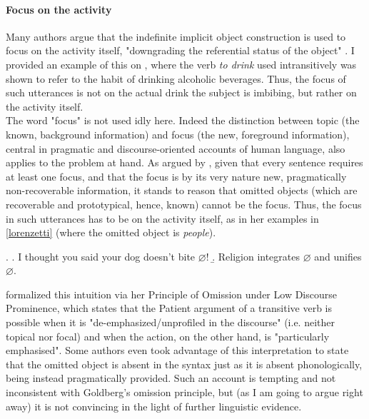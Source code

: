 \paragraph{Focus on the activity} 

Many authors \parencite{Liu2008, Garcia-VelascoMunoz2002, Fillmore1986, Ahringberg2015, Levin1993, Yasutake1987, Goldberg2005} argue that the indefinite implicit object construction is used to focus on the activity itself, "downgrading the referential status of the object" \parencite[7-8]{Garcia-VelascoMunoz2002}. I provided an example of this on , where the verb \textit{to drink} used intransitively was shown to refer to the habit of drinking alcoholic beverages. Thus, the focus of such utterances is not on the actual drink the subject is imbibing, but rather on the activity itself.\\
The word "focus" is not used idly here. Indeed the distinction between topic (the known, background information) and focus (the new, foreground information), central in pragmatic and discourse-oriented accounts of human language, also applies to the problem at hand. As argued by \textcite[66]{Lorenzetti2008}, given that every sentence requires at least one focus, and that the focus is by its very nature new, pragmatically non-recoverable information, it stands to reason that omitted objects (which are recoverable and prototypical, hence, known) cannot be the focus. Thus, the focus in such utterances has to be on the activity itself, as in her examples in \ref{lorenzetti} (where the omitted object is \textit{people}).

\ex. \label{lorenzetti} \a. \label{lorenzetti1} I thought you said your dog doesn’t bite $\varnothing$!
\b. \label{lorenzetti2} Religion integrates $\varnothing$ and unifies $\varnothing$.

\textcite{Goldberg2005} formalized this intuition via her Principle of Omission under Low Discourse Prominence, which states that the Patient argument of a transitive verb is possible when it is "de-emphasized/unprofiled in the discourse" (i.e. neither topical nor focal) and when the action, on the other hand, is "particularly emphasised". Some authors \parencite{groefsema1995understood, recanati2002unarticulated, WilsonSperber2000, iten2005null, hall2009free} even took advantage of this interpretation to state that the omitted object is absent in the syntax just as it is absent phonologically, being instead pragmatically provided.  Such an account is tempting and not inconsistent with Goldberg's omission principle, but (as I am going to argue right away) it is not convincing in the light of further linguistic evidence. 


